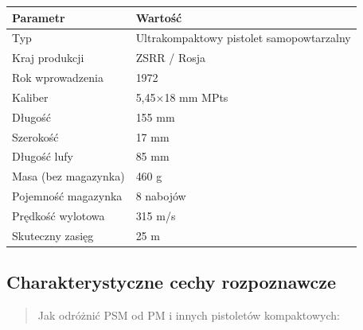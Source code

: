 \documentclass[12pt,oneside]{book}
\begin{document}
\begin{longtable}[]{@{}ll@{}}
\toprule\noalign{}
Parametr & Wartość \\
\midrule\noalign{}
\endhead
\bottomrule\noalign{}
\endlastfoot
Typ & Ultrakompaktowy pistolet samopowtarzalny \\
Kraj produkcji & ZSRR / Rosja \\
Rok wprowadzenia & 1972 \\
Kaliber & 5,45×18 mm MPts \\
Długość & 155 mm \\
Szerokość & 17 mm \\
Długość lufy & 85 mm \\
Masa (bez magazynka) & 460 g \\
Pojemność magazynka & 8 nabojów \\
Prędkość wylotowa & 315 m/s \\
Skuteczny zasięg & 25 m \\
\end{longtable}

\subsection{Charakterystyczne cechy
rozpoznawcze}\label{charakterystyczne-cechy-rozpoznawcze-105}

\begin{quote}
Jak odróżnić PSM od PM i innych pistoletów kompaktowych:
\end{quote}
\end{document}
